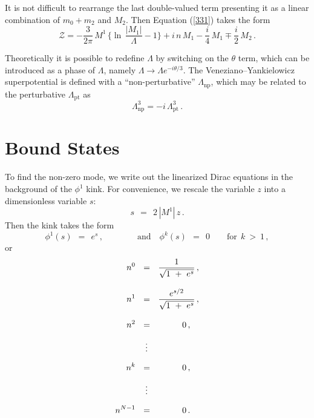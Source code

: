 \documentclass[epsfig,12pt]{article}
\def\beq{\begin{equation}}
\def\eeq{\end{equation}}
\def\beq{\begin{equation}}
\def\eeq{\end{equation}}
\newcommand{\mc}[1]{\mathcal{#1}}
\begin{document}
It is not difficult to rearrange the last double-valued term presenting it as a linear combination of $m_0+m_2$ and $M_2$.
Then Equation (\ref{331}) takes the form
\beq
   \mc{Z} = 
-
       \frac{3}{2\pi}\, M^1\, \Big\{ \ln\, \frac {   |M_1|   }
                                                 {  \Lambda  } -1 \Big\} +i\,n \, M_1
                                                 -\frac{i}{4} \, M_1 \mp \frac{i}{2}\, M_2\,.
\eeq


       Theoretically it is possible to redefine $ \Lambda $ by switching on the $\theta$ term,
       which can be introduced as a phase of $\Lambda$, namely $\Lambda \to \Lambda e^{-i\theta /3}$.
       The Veneziano--Yankielowicz superpotential is defined with a ``non-perturbative'' 
       $ \Lambda_\text{np} $, which may be related to the perturbative $ \Lambda_\text{pt} $ as
       \beq
       \Lambda_\text{np}^3 =  -i \, \Lambda_\text{pt}^3\,. 
       \eeq


















\section{Bound States}
\label{bound}

\setcounter{equation}{0}

       To find the non-zero mode, we write out the linearized Dirac equations in the background
       of the $ \phi^1 $ kink.
       For convenience, we rescale the variable $ z $ into a dimensionless variable $ s $:
\beq
       s ~~=~~ 2\, |M^1|\, z\,.
\eeq
       Then the kink takes the form
\beq
       \phi^1(s) ~~=~~ e^s\,,\qquad\qquad\text{and}\quad \phi^k(s) ~~=~~ 0 \qquad \text{for}~~ k ~>~ 1\,,
\eeq
       or
\begin{align}
%
\notag
       n^0  & ~~=~~ \frac {             1              }
                          {    \sqrt{ 1 ~+~ e^s }      }\,, \\[3mm]
%
\notag
       n^1  & ~~=~~ \frac {          e^{s/2}           }
                          {    \sqrt{ 1 ~+~ e^s }      }\,, \\[3mm]
%
\notag
       n^2  & ~~=~~ \qquad~~\, 0\,,  \\[2mm]
%	 
            & ~~~\,\vdots          \\[2mm]
%
\notag
       n^k  & ~~=~~ \qquad~~\, 0\,,  \\[2mm]
%	 
\notag
            & ~~~\,\vdots          \\[2mm]
%
\notag
       n^{N-1} & ~~=~~ \qquad~~\, 0\,.                
\end{align}
\end{document}
